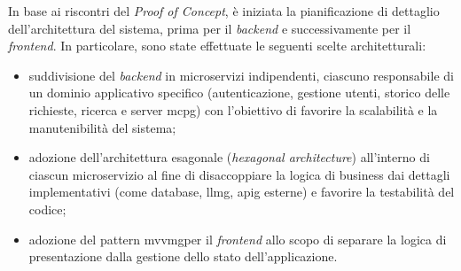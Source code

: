 In base ai riscontri del \textit{Proof of Concept}, è iniziata la pianificazione 
di dettaglio dell'architettura del sistema, prima per il 
\textit{backend} e successivamente per il \textit{frontend}.
In particolare, sono state effettuate le seguenti scelte architetturali:
\begin{itemize}
    \item suddivisione del \textit{backend} in microservizi indipendenti, 
    ciascuno responsabile di un dominio applicativo specifico (autenticazione, 
    gestione utenti, storico delle richieste, ricerca e server \gls{mcpg}) con 
    l'obiettivo di favorire la scalabilità e la manutenibilità del sistema;
    \item adozione dell'architettura esagonale (\textit{hexagonal architecture})
    all'interno di ciascun microservizio al fine di disaccoppiare la logica di business
    dai dettagli implementativi (come database, \gls{llmg}, \gls{apig} esterne) e
    favorire la testabilità del codice;
    \item adozione del pattern \gls{mvvmg}\glsfirstoccur per il \textit{frontend} allo scopo di 
    separare la logica di presentazione dalla gestione dello stato dell'applicazione.
\end{itemize}


